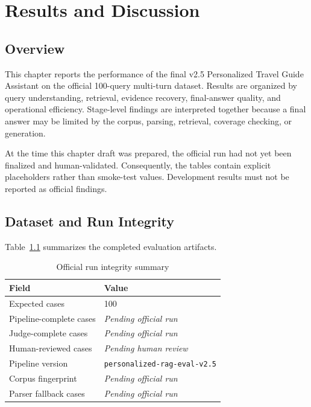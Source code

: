 \chapter{Results and Discussion}
\label{chap:results}


\section{Overview}

This chapter reports the performance of the final v2.5 Personalized Travel
Guide Assistant on the official 100-query multi-turn dataset. Results are
organized by query understanding, retrieval, evidence recovery, final-answer
quality, and operational efficiency. Stage-level findings are interpreted
together because a final answer may be limited by the corpus, parsing,
retrieval, coverage checking, or generation.

At the time this chapter draft was prepared, the official run had not yet been
finalized and human-validated. Consequently, the tables contain explicit
placeholders rather than smoke-test values. Development results must not be
reported as official findings.

\section{Dataset and Run Integrity}

Table~\ref{tab:run-integrity} summarizes the completed evaluation artifacts.

\begin{table}[H]
\centering
\caption{Official run integrity summary}
\label{tab:run-integrity}
\begin{tabular}{ll}
\hline
\textbf{Field} & \textbf{Value} \\
\hline
Expected cases & 100 \\
Pipeline-complete cases & \textit{Pending official run} \\
Judge-complete cases & \textit{Pending official run} \\
Human-reviewed cases & \textit{Pending human review} \\
Pipeline version & \texttt{personalized-rag-eval-v2.5} \\
Corpus fingerprint & \textit{Pending official run} \\
Parser fallback cases & \textit{Pending official run} \\
\hline
\end{tabular}
\end{table}


